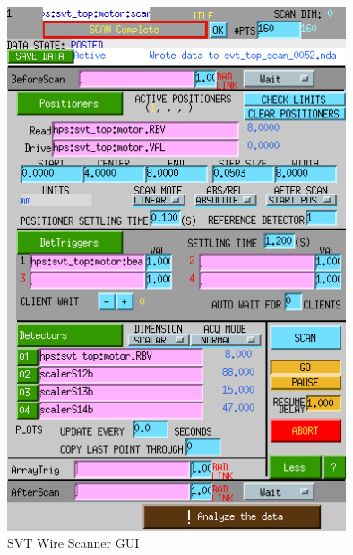 \documentclass[12pt]{report}
\begin{document}
\begin{figure}[ht!]
\centering
\includegraphics[width=10cm]{svt_wirescan_gui}
\caption{SVT Wire Scanner GUI}
\label{scannergui}
\end{figure}

\appendix
\end{document}
